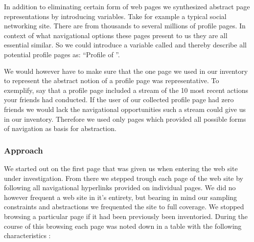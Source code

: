 In addition to eliminating certain form of web pages we synthesized abstract
page representations by introducing variables. Take for example a typical
social networking site. There are from thousands to several millions of
profile pages. In context of what navigational options these pages present to
us they are all essential similar. So we could introduce a variable called
%
and thereby describe all potential profile pages as: ``Profile
of ''.

We would however have to make sure that the one page we used in our inventory
to represent the abstract notion of a profile page was representative. To
exemplify, say that a profile page included a stream of the 10 most recent
actions your friends had conducted. If the user of our collected profile page
had zero friends we would lack the navigational opportunities such a stream
could give us in our inventory. Therefore we used only pages which provided
all possible forms of navigation as basis for abstraction.

\subsubsection{Approach}

We started out on the first page that was given us when entering the web site
under investigation. From there we stepped trough each page of the web site
by following all navigational hyperlinks provided on individual pages.
We did no however frequent a web site in it's entirety, but bearing in mind
our sampling constraints and abstractions we frequented the site to full
coverage. We stopped browsing a particular page if it%
had been previously been inventoried. During the course of this browsing
each page was noted down in a table with the following characteristics%
:

